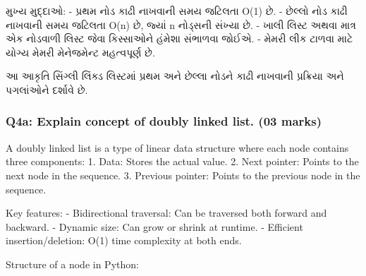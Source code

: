 મુખ્ય મુદ્દાઓ: - પ્રથમ નોડ કાઢી નાખવાની સમય જટિલતા O(1) છે. - છેલ્લો નોડ કાઢી
નાખવાની સમય જટિલતા O(n) છે, જ્યાં n નોડ્સની સંખ્યા છે. - ખાલી લિસ્ટ અથવા માત્ર એક
નોડવાળી લિસ્ટ જેવા કિસ્સાઓને હંમેશા સંભાળવા જોઈએ. - મેમરી લીક ટાળવા માટે યોગ્ય
મેમરી મેનેજમેન્ટ મહત્વપૂર્ણ છે.

\begin{Shaded}
\begin{Highlighting}[]
\end{Highlighting}
\end{Shaded}

આ આકૃતિ સિંગ્લી લિંક્ડ લિસ્ટમાં પ્રથમ અને છેલ્લા નોડને કાઢી નાખવાની પ્રક્રિયા અને
પગલાંઓને દર્શાવે છે.

\hypertarget{q4a-explain-concept-of-doubly-linked-list.-03-marks}{%
\subsubsection{Q4a: Explain concept of doubly linked list. (03
marks)}\label{q4a-explain-concept-of-doubly-linked-list.-03-marks}}

A doubly linked list is a type of linear data structure where each node
contains three components: 1. Data: Stores the actual value. 2. Next
pointer: Points to the next node in the sequence. 3. Previous pointer:
Points to the previous node in the sequence.

Key features: - Bidirectional traversal: Can be traversed both forward
and backward. - Dynamic size: Can grow or shrink at runtime. - Efficient
insertion/deletion: O(1) time complexity at both ends.

Structure of a node in Python:

\begin{Shaded}
\begin{Highlighting}[]
     \NormalTok{(}
        \OperatorTok{=}
         \OperatorTok{=} 
        \OperatorTok{=} 
\end{Highlighting}
\end{Shaded}

